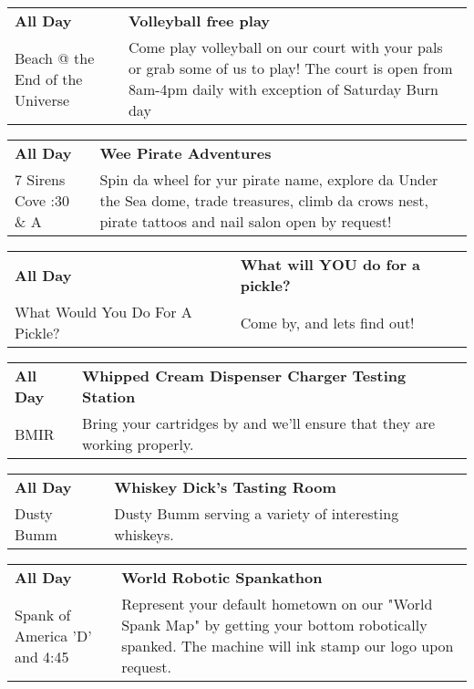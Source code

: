 \begin{tabular}{ p{1in} p{2.2in} }
    \textbf{All Day} & \textbf{Volleyball free play } \\
    Beach @ the End of the Universe \newline  & Come play volleyball on our court with your pals or grab some of us to play! The court is open from 8am-4pm daily with exception of Saturday Burn day \\
    \hline 
\end{tabular}
    
\begin{tabular}{ p{1in} p{2.2in} }
    \textbf{All Day} & \textbf{Wee Pirate Adventures} \\
    7 Sirens Cove \newline 7:30 \& A & Spin da wheel for yur pirate name, explore da Under the Sea dome, trade treasures, climb da crows nest, pirate tattoos and nail salon open by request! \\
    \hline 
\end{tabular}
    
\begin{tabular}{ p{1in} p{2.2in} }
    \textbf{All Day} & \textbf{What will YOU do for a pickle?} \\
    What Would You Do For A Pickle? \newline  & Come by, and lets find out! \\
    \hline 
\end{tabular}
    
\begin{tabular}{ p{1in} p{2.2in} }
    \textbf{All Day} & \textbf{Whipped Cream Dispenser Charger Testing Station} \\
    BMIR \newline  & Bring your cartridges by and we'll ensure that they are working properly. \\
    \hline 
\end{tabular}
    
\begin{tabular}{ p{1in} p{2.2in} }
    \textbf{All Day} & \textbf{Whiskey Dick's Tasting Room} \\
    Dusty Bumm \newline  & Dusty Bumm serving a variety of interesting whiskeys. \\
    \hline 
\end{tabular}
    
\begin{tabular}{ p{1in} p{2.2in} }
    \textbf{All Day} & \textbf{World Robotic Spankathon} \\
    Spank of America \newline 'D' and 4:45 & Represent your default hometown on our "World Spank Map" by getting your bottom robotically spanked. The machine will ink stamp our logo upon request. \\
    \hline 
\end{tabular}
    
